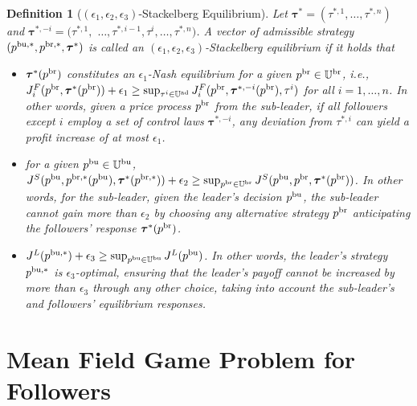\documentclass[11pt]{article}
\newtheorem{definition}{Definition}[section]
\numberwithin{equation}{section}
\begin{document}
\begin{definition}[$(\epsilon_1, \epsilon_2, \epsilon_3)$-Stackelberg Equilibrium]
Let $\boldsymbol{\tau}^*=(\tau^{*,1}, \ldots, \tau^{*,n})$ and $\boldsymbol{\tau}^{*,-i}=(\tau^{*,1},$ $ \ldots, \tau^{*, i-1}, \tau^i, \ldots, \tau^{*,n})$. A vector of admissible strategy $(p^{{\rm bu},*}, p^{{\rm br},*}, \boldsymbol{\tau}^*)$ is called an $(\epsilon_1, \epsilon_2, \epsilon_3)$-Stackelberg equilibrium if it holds that
\begin{itemize}
\item[{\rm(i)}] $\boldsymbol{\tau}^*(p^{\rm br})$ constitutes an $\epsilon_1$-Nash equilibrium for a given $p^{\rm br}\in\mathbb{U}^{\rm br}$, i.e., $J_i^F(p^{\rm br}, \boldsymbol{\tau}^*(p^{\rm br}))+\epsilon_1 \geq \sup_{\tau^i\in \mathbb{U}^{\rm ad}} J_i^F(p^{\rm br}, \boldsymbol{\tau}^{*,-i}(p^{\rm br}), \tau^i)$ for all $i=1,\ldots,n$. In other words, given a price process $p^{{\rm br}}$ from the sub-leader, if all followers except $i$ employ a set of control laws $\boldsymbol{\tau}^{*,-i}$, any deviation from $\tau^{*,i}$ can yield a profit increase of at most $\epsilon_1$.

\item[{\rm(ii)}] for a given $p^{\rm bu}\in\mathbb{U}^{\rm bu}$, $J^S(p^{\rm bu}, p^{{\rm br},*}(p^{\rm bu}), \boldsymbol{\tau}^*(p^{{\rm br},*}))+\epsilon_2 \geq \sup_{p^{\rm br}\in\mathbb{U}^{\rm br}}J^S(p^{\rm bu}, p^{\rm br}, \boldsymbol{\tau}^*(p^{\rm br}))$. In other words, for the sub-leader, given the leader’s decision $p^{{\rm bu}}$,  the sub-leader cannot gain more than $\epsilon_2$ by choosing any alternative strategy $p^{{\rm br}}$ anticipating the followers’ response $\boldsymbol{\tau}^*(p^{{\rm br}})$.

\item[{\rm(iii)}] $J^L(p^{{\rm bu},*})+\epsilon_3\geq  \sup_{p^{\rm bu}\in\mathbb{U}^{\rm bu}}J^L(p^{\rm bu})$. In other words, the leader’s strategy $p^{{\rm bu},*}$ is $\epsilon_3$-optimal, ensuring that the leader’s payoff cannot be increased by more than $\epsilon_3$ through any other choice, taking into account the sub-leader’s and followers’ equilibrium responses.
\end{itemize}
\end{definition}

\section{Mean Field Game Problem for Followers}\label{sec:3}
\end{document}
